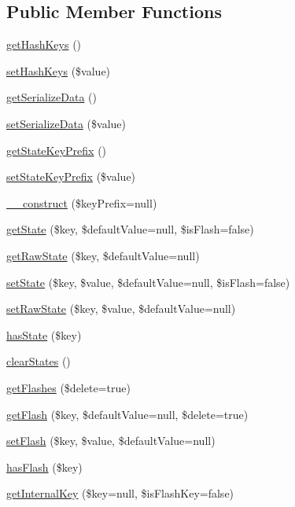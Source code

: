 \subsection*{Public Member Functions}
\begin{DoxyCompactItemize}
\item 
\hyperlink{classCPSStateManager_a41d02f19b7f23efd1078c524f342b6e2}{getHashKeys} ()
\item 
\hyperlink{classCPSStateManager_ae2837e14e8cd5051d921990b28d2691e}{setHashKeys} (\$value)
\item 
\hyperlink{classCPSStateManager_a98212fc10654d0cfdd546c3dd5d35176}{getSerializeData} ()
\item 
\hyperlink{classCPSStateManager_a7ea25cbbe7a4cab51edcbbf5841ca3bf}{setSerializeData} (\$value)
\item 
\hyperlink{classCPSStateManager_aabba0be5715e54fad7739b40a7be2dfd}{getStateKeyPrefix} ()
\item 
\hyperlink{classCPSStateManager_aef8c74f8d1d94b8c5c046027ba3ad424}{setStateKeyPrefix} (\$value)
\item 
\hyperlink{classCPSStateManager_a1ff82bdcd6747129d97e12934db2def8}{\_\-\_\-construct} (\$keyPrefix=null)
\item 
\hyperlink{classCPSStateManager_a8bf40ae0d2528f36e3df46e28f56e1c8}{getState} (\$key, \$defaultValue=null, \$isFlash=false)
\item 
\hyperlink{classCPSStateManager_ad877e4dd3c0592fdaf903133255b2e56}{getRawState} (\$key, \$defaultValue=null)
\item 
\hyperlink{classCPSStateManager_aafc00fb76764975385c8a3fa54cfece3}{setState} (\$key, \$value, \$defaultValue=null, \$isFlash=false)
\item 
\hyperlink{classCPSStateManager_a4cac4fe30e263f66499d37a90a4bc389}{setRawState} (\$key, \$value, \$defaultValue=null)
\item 
\hyperlink{classCPSStateManager_ab04376998e1a1094f4c415a79018ca96}{hasState} (\$key)
\item 
\hyperlink{classCPSStateManager_a5623d45a4dfcce122b732b0377364d66}{clearStates} ()
\item 
\hyperlink{classCPSStateManager_ae29eea2995e7e3e2789181f632ae95a5}{getFlashes} (\$delete=true)
\item 
\hyperlink{classCPSStateManager_a3ac1554d96ad28d5ab40d8ea5b6a11fe}{getFlash} (\$key, \$defaultValue=null, \$delete=true)
\item 
\hyperlink{classCPSStateManager_a7ae4f6603338ff51e36d4da8219b3a64}{setFlash} (\$key, \$value, \$defaultValue=null)
\item 
\hyperlink{classCPSStateManager_a0ac89d09ac48bba800f8dd87a0e790fc}{hasFlash} (\$key)
\item 
\hyperlink{classCPSStateManager_aff7069e450d5b0ae178f05baeb48fa20}{getInternalKey} (\$key=null, \$isFlashKey=false)
\end{DoxyCompactItemize}
